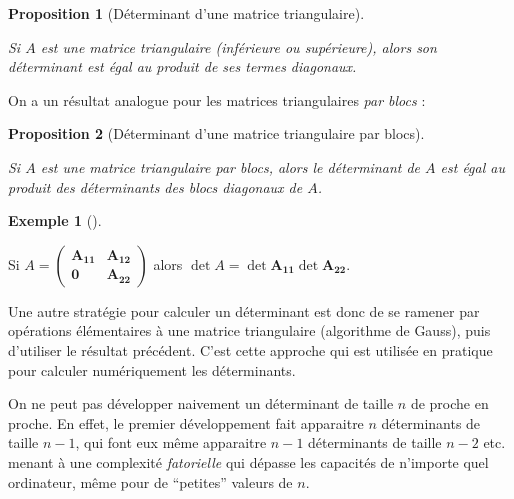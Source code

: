 \documentclass[
  french,
  letterpaper,
  DIV=11,
  numbers=noendperiod]{scrreprt}
\theoremstyle{plain}
\theoremstyle{definition}
\theoremstyle{plain}
\newtheorem{proposition}{Proposition}[chapter]
\theoremstyle{plain}
\theoremstyle{definition}
\theoremstyle{definition}
\newtheorem{example}{Exemple}[chapter]
\theoremstyle{plain}
\theoremstyle{remark}
\newcounter{quartocalloutnteno}
\newcommand{\quartocalloutnte}[1]{\refstepcounter{quartocalloutnteno}\label{#1}}
\begin{document}
\begin{proposition}[Déterminant d'une matrice
triangulaire]\protect\hypertarget{prp-triangulaire}{}\label{prp-triangulaire}

Si \(A\) est une matrice triangulaire (inférieure ou supérieure), alors
son déterminant est égal au produit de ses termes diagonaux.

\end{proposition}

On a un résultat analogue pour les matrices triangulaires \emph{par
blocs} :

\begin{proposition}[Déterminant d'une matrice triangulaire par
blocs]\protect\hypertarget{prp-triangulaire-bloc}{}\label{prp-triangulaire-bloc}

Si \(A\) est une matrice triangulaire par blocs, alors le déterminant de
\(A\) est égal au produit des déterminants des blocs diagonaux de \(A\).

\end{proposition}

\begin{example}[]\protect\hypertarget{exm-triangulaire-bloc}{}\label{exm-triangulaire-bloc}

Si \(A = \begin{pmatrix}
    \boldsymbol{A_{11}}&\boldsymbol{A_{12}}\\
\boldsymbol{0}&\boldsymbol{A_{22}}
\end{pmatrix}\) alors
\(\det A = \det \boldsymbol{A_{11}} \det \boldsymbol{A_{22}}\).

\end{example}

Une autre stratégie pour calculer un déterminant est donc de se ramener
par opérations élémentaires à une matrice triangulaire (algorithme de
Gauss), puis d'utiliser le résultat précédent. C'est cette approche qui
est utilisée en pratique pour calculer numériquement les déterminants.

\begin{tcolorbox}[enhanced jigsaw, arc=.35mm, bottomrule=.15mm, bottomtitle=1mm, breakable, colback=white, colbacktitle=quarto-callout-note-color!10!white, colframe=quarto-callout-note-color-frame, coltitle=black, left=2mm, leftrule=.75mm, opacityback=0, opacitybacktitle=0.6, rightrule=.15mm, title=\textcolor{quarto-callout-note-color}{\faInfo}\hspace{0.5em}{Note \ref*{nte-factorielle}}, titlerule=0mm, toprule=.15mm, toptitle=1mm]

\quartocalloutnte{nte-factorielle} 

On ne peut pas développer naivement un déterminant de taille \(n\) de
proche en proche. En effet, le premier développement fait apparaitre
\(n\) déterminants de taille \(n-1\), qui font eux même apparaitre
\(n-1\) déterminants de taille \(n-2\) etc. menant à une complexité
\emph{fatorielle} qui dépasse les capacités de n'importe quel
ordinateur, même pour de ``petites'' valeurs de \(n\).

\end{tcolorbox}
\end{document}
